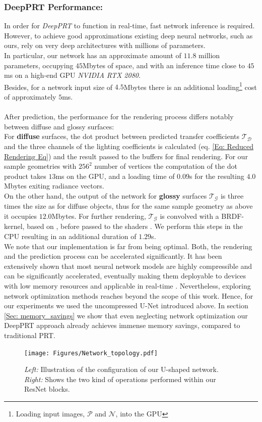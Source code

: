 \subsubsection*{DeepPRT Performance: \\}
In order for \textit{DeepPRT} to function in real-time, fast network inference is required. However, to achieve good approximations existing deep neural networks, such as ours, rely on very deep architectures with millions of parameters. 
\\
In particular, our network has an approximate amount of $11.8$ million parameters, occupying $45$Mbytes of space, and with an inference time close to $45$ms on a high-end GPU \textit{NVIDIA RTX 2080}. \\
Besides, for a network input size of $4.5$Mbytes there is an additional loading\footnote{Loading input images, $\mathcal{P}$ and $\mathcal{N}$, into the GPU} cost of approximately $5$ms.  
\\
\\
After prediction, the performance for the rendering process differs notably between diffuse and glossy surfaces:
\\ 
For \textbf{diffuse} surfaces, the dot product between predicted transfer coefficients $\mathcal{T_D}$ and the three channels of the lighting coefficients is calculated (eq. \ref{Eq: Reduced Rendering Eq}) and the result passed to the buffers for final rendering.  For our sample geometries with $256^2$ number of vertices the computation of the dot product takes $13$ms on the GPU, and a loading time of $0.09$s for the resulting $4.0$Mbytes exiting radiance vectors.
\\ 
On the other hand, the output of the network for \textbf{glossy} surfaces $\mathcal{T_G}$ is three times the size as for diffuse objects, thus for the same sample geometry as above it occupies $12.0$Mbytes. For further rendering,  $\mathcal{T_G}$ is convolved with a BRDF-kernel, based on \cite{ BRDF_kernel}, before passed to the shaders \cite{sloan2002precomputed}.  We perform this steps in the CPU resulting in an additional duration of $1.29$s. 
\\
We note that our implementation is far from being optimal.  Both, the rendering and the prediction process can be accelerated significantly. It has been extensively shown that most neural network models are highly compressible and can be significantly accelerated, eventually making them deployable to devices with low memory resources and applicable in real-time \cite{Deep_Compression, Survey_NN_Compression}.
Nevertheless, exploring network optimization methods reaches beyond the scope of this work. Hence, for our experiments we used the uncompressed U-Net introduced above. In section \ref{Sec: memory_savings} we show that even neglecting network optimization our DeepPRT approach already achieves immense memory savings, compared to traditional PRT. 
\begin{figure}[t]
  \centering
    \texttt{[image: Figures/Network\_topology.pdf]}
     \caption{\textit{Left:} Illustration of the configuration of our U-shaped network. \textit{Right:} Shows the two kind of operations performed within our ResNet blocks.}
     \label{Fig: NetworkTopology}
\end{figure}

  


